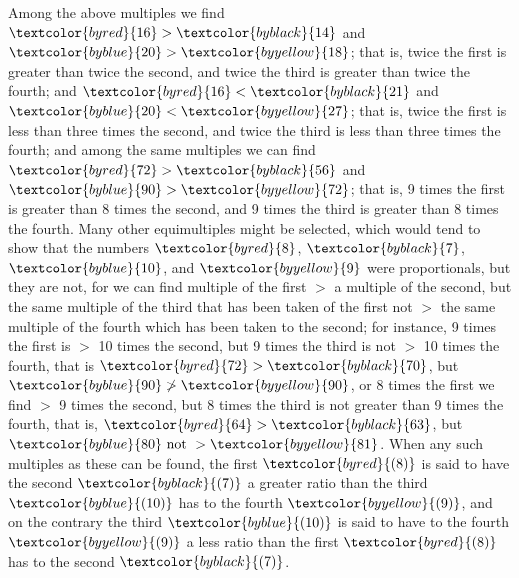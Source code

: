 \documentclass[booklanguage=english]{byrnebook}
\begin{document}
Among the above multiples we find $\textcolor{byred}{16} > \textcolor{byblack}{14}$ and $\textcolor{byblue}{20} > \textcolor{byyellow}{18}$; that is, twice the first is greater than twice the second, and twice the third is greater than twice the fourth; and $\textcolor{byred}{16} < \textcolor{byblack}{21}$ and $\textcolor{byblue}{20} < \textcolor{byyellow}{27}$; that is, twice the first is less than three times the second, and twice the third is less than three times the fourth; and among the same multiples we can find $\textcolor{byred}{72} > \textcolor{byblack}{56}$ and $\textcolor{byblue}{90} > \textcolor{byyellow}{72}$; that is, 9 times the first is greater than 8 times the second, and 9 times the third is greater than 8 times the fourth. Many other equimultiples might be selected, which would tend to show that the numbers $\textcolor{byred}{8}$, $\textcolor{byblack}{7}$, $\textcolor{byblue}{10}$, and $\textcolor{byyellow}{9}$ were proportionals, but they are not, for we can find multiple of the first $>$ a multiple of the second, but the same multiple of the third that has been taken of the first not $>$ the same multiple of the fourth which has been taken to the second; for instance, 9 times the first is $>$ 10 times the second, but 9 times the third is not $>$ 10 times the fourth, that is $\textcolor{byred}{72} > \textcolor{byblack}{70}$, but $\textcolor{byblue}{90} \ngtr \textcolor{byyellow}{90}$, or 8 times the first we find $>$ 9 times the second, but 8 times the third is not greater than 9 times the fourth, that is, $\textcolor{byred}{64} > \textcolor{byblack}{63}$, but $\textcolor{byblue}{80} \mbox{ not } > \textcolor{byyellow}{81}$. When any such multiples as these can be found, the first $\textcolor{byred}{(8)}$ is said to have the second $\textcolor{byblack}{(7)}$ a greater ratio than the third $\textcolor{byblue}{(10)}$ has to the fourth $\textcolor{byyellow}{(9)}$, and on the contrary the third $\textcolor{byblue}{(10)}$ is said to have to the fourth $\textcolor{byyellow}{(9)}$ a less ratio than the first $\textcolor{byred}{(8)}$ has to the second $\textcolor{byblack}{(7)}$.

\vfill\pagebreak

\label{prop:V.VIII}
\end{document}
